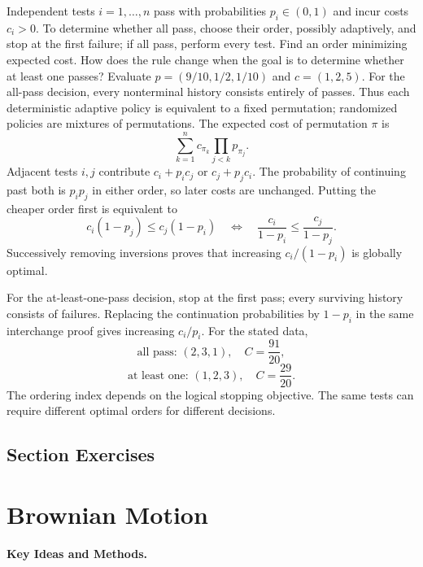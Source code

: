 Independent tests $i=1,\ldots,n$ pass with probabilities $p_i\in(0,1)$ and incur costs $c_i>0$. To determine whether all pass, choose their order, possibly adaptively, and stop at the first failure; if all pass, perform every test. Find an order minimizing expected cost. How does the rule change when the goal is to determine whether at least one passes? Evaluate $p=(9/10,1/2,1/10)$ and $c=(1,2,5)$.
\solution For the all-pass decision, every nonterminal history consists entirely of passes. Thus each deterministic adaptive policy is equivalent to a fixed permutation; randomized policies are mixtures of permutations. The expected cost of permutation $\pi$ is
\[
 \sum_{k=1}^n c_{\pi_k}\prod_{j<k}p_{\pi_j}.
\]
Adjacent tests $i,j$ contribute $c_i+p_ic_j$ or $c_j+p_jc_i$. The probability of continuing past both is $p_ip_j$ in either order, so later costs are unchanged. Putting the cheaper order first is equivalent to
\[
 c_i(1-p_j)\le c_j(1-p_i)
 \quad\Longleftrightarrow\quad
 \frac{c_i}{1-p_i}\le\frac{c_j}{1-p_j}.
\]
Successively removing inversions proves that increasing $c_i/(1-p_i)$ is globally optimal.

For the at-least-one-pass decision, stop at the first pass; every surviving history consists of failures. Replacing the continuation probabilities by $1-p_i$ in the same interchange proof gives increasing $c_i/p_i$. For the stated data,
\[
 \boxed{\text{all pass: }(2,3,1),\quad C=\frac{91}{20}},
\]
\[
 \boxed{\text{at least one: }(1,2,3),\quad C=\frac{29}{20}}.
\]
\insight The ordering index depends on the logical stopping objective. The same tests can require different optimal orders for different decisions.

\par{}
\subsection*{Section Exercises}



\section{Brownian Motion}
\noindent\textbf{Key Ideas and Methods.}\enspace




